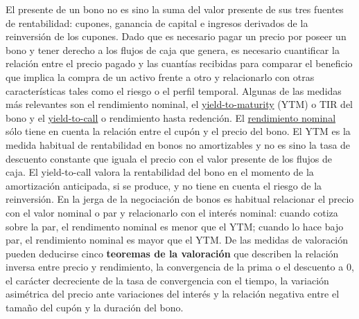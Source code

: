 \documentclass{nuevotema}
\begin{document}
El  presente de un bono no es sino la suma del valor presente de sus tres fuentes de rentabilidad: cupones, ganancia de capital e ingresos derivados de la reinversión de los cupones. Dado que es necesario pagar un precio por poseer un bono y tener derecho a los flujos de caja que genera, es necesario cuantificar la relación entre el precio pagado y las cuantías recibidas para comparar el beneficio que implica la compra de un activo frente a otro y relacionarlo con otras características tales como el riesgo o el perfil temporal. Algunas de las medidas más relevantes son el rendimiento nominal, el \underline{yield-to-maturity} (YTM) o TIR del bono y el \underline{yield-to-call} o rendimiento hasta redención. El \underline{rendimiento nominal} sólo tiene en cuenta la relación entre el cupón y el precio del bono. El YTM es la medida habitual de rentabilidad en bonos no amortizables y no es sino la tasa de descuento constante que iguala el precio con el valor presente de los flujos de caja. El yield-to-call valora la rentabilidad del bono en el momento de la amortización anticipada, si se produce, y no tiene en cuenta el riesgo de la reinversión. En la jerga de la negociación de bonos es habitual relacionar el precio con el valor nominal o par y relacionarlo con el interés nominal: cuando cotiza sobre la par, el rendimento nominal es menor que el YTM; cuando lo hace bajo par, el rendimiento nominal es mayor que el YTM. De las medidas de valoración pueden deducirse cinco \textbf{teoremas de la valoración} que describen la relación inversa entre precio y rendimiento, la convergencia de la prima o el descuento a 0, el carácter decreciente de la tasa de convergencia con el tiempo, la variación asimétrica del precio ante variaciones del interés y la relación negativa entre el tamaño del cupón y la duración del bono.
\end{document}
